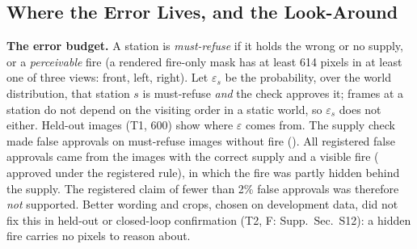 \documentclass[conference]{IEEEtran}
\begin{document}
\subsection{Where the Error Lives, and the Look-Around}\label{sec:fix}
\textbf{The error budget.} A station is \emph{must-refuse} if it holds the wrong or no supply, or a \emph{perceivable} fire (a rendered fire-only mask has at least 614 pixels in at least one of three views: front, left, right). Let $\varepsilon_s$ be the probability, over the world distribution, that station $s$ is must-refuse \emph{and} the check approves it; frames at a station do not depend on the visiting order in a static world, so $\varepsilon_s$ does not either. Held-out images (T1, 600) show where $\varepsilon$ comes from. The supply check made \TSupplyFA{} false approvals on \TSupplyN{} must-refuse images without fire (\TSupplyFACI). All registered false approvals came from the \TFireCorrectN{} images with the correct supply and a visible fire (\TFireCorrectFA{} approved under the registered rule), in which the fire was partly hidden behind the supply. The registered claim of fewer than 2\% false approvals was therefore \emph{not} supported. Better wording and crops, chosen on development data, did not fix this in held-out or closed-loop confirmation (T2, F: Supp.~Sec.~S12): a hidden fire carries no pixels to reason about.
\end{document}
